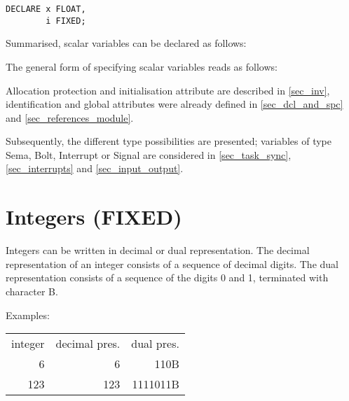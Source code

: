 \begin{lstlisting}
DECLARE x FLOAT,
        i FIXED;
\end{lstlisting}

Summarised, scalar variables can be declared as follows:

\begin{grammarframe}








\end{grammarframe}

The general form of specifying scalar variables reads as follows:

\begin{grammarframe}



\end{grammarframe}

Allocation protection and initialisation attribute are described in 
\ref{sec_inv},
identification and global attributes were already defined
in \ref{sec_dcl_and_spc} and \ref{sec_references_module}.

Subsequently, the different type possibilities are presented; variables
of type Sema, Bolt, Interrupt or Signal are considered in 
\ref{sec_task_sync}, \ref{sec_interrupts} and
\ref{sec_input_output}.

\section{Integers (FIXED)}   %
\label{sec_type_fixed}

Integers can be written in decimal or dual representation. The decimal
representation of an integer consists of a sequence of decimal digits. The dual
representation consists of a sequence of the digits 0 and 1, terminated
with character B.

Examples:

\begin{tabular}{rrr}
integer & decimal pres. & dual pres. \\
      6 &             6 &     110B \\
    123 &           123 & 1111011B
\end{tabular}

